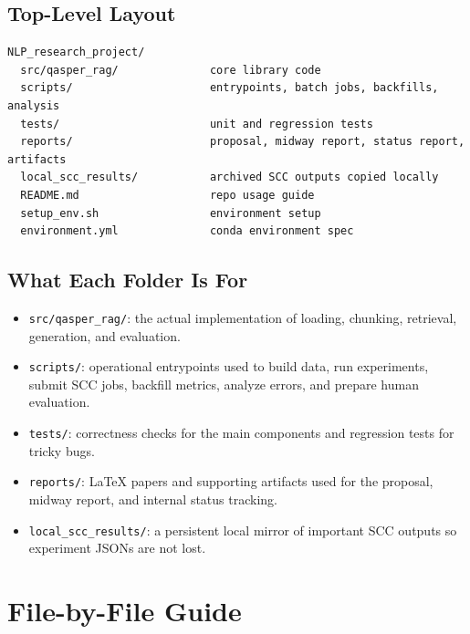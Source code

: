 \documentclass[11pt]{article}
\begin{document}
\subsection{Top-Level Layout}
\begin{verbatim}
NLP_research_project/
  src/qasper_rag/              core library code
  scripts/                     entrypoints, batch jobs, backfills, analysis
  tests/                       unit and regression tests
  reports/                     proposal, midway report, status report, artifacts
  local_scc_results/           archived SCC outputs copied locally
  README.md                    repo usage guide
  setup_env.sh                 environment setup
  environment.yml              conda environment spec
\end{verbatim}

\subsection{What Each Folder Is For}
\begin{itemize}
  \item \texttt{src/qasper\_rag/}: the actual implementation of loading, chunking, retrieval, generation, and evaluation.
  \item \texttt{scripts/}: operational entrypoints used to build data, run experiments, submit SCC jobs, backfill metrics, analyze errors, and prepare human evaluation.
  \item \texttt{tests/}: correctness checks for the main components and regression tests for tricky bugs.
  \item \texttt{reports/}: LaTeX papers and supporting artifacts used for the proposal, midway report, and internal status tracking.
  \item \texttt{local\_scc\_results/}: a persistent local mirror of important SCC outputs so experiment JSONs are not lost.
\end{itemize}

\section{File-by-File Guide}
\end{document}
